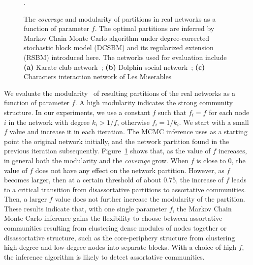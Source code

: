\begin{figure}[!htb]
    \caption{The \textit{coverage} and modularity  of partitions in real networks as a function of parameter $f$. The optimal partitions are inferred by Markov Chain Monte Carlo algorithm under degree-corrected stochastic block model (DCSBM) and its regularized extension (RSBM) introduced here. The networks used for evaluation include \textbf{(a)} Karate club network~\cite{zachary1977information}; \textbf{(b)} Dolphin social network~\cite{lusseau2003bottlenose}; \textbf{(c)} Characters interaction network of Les Miserables~\cite{newman2004finding}}.
    \label{fig:gsbm_real2}
\end{figure}

We evaluate the modularity~\cite{newman2006modularity} of resulting partitions of the real networks as a function of parameter $f$. 
A high modularity indicates the strong community structure. In our experiments, we use a constant $f$ such that $f_i=f$ for each
node $i$ in the network with degree $k_i>1/f$, otherwise $f_i=1/k_i$. We start with a small $f$ value and increase it in each iteration.
The MCMC inference uses as a starting point the original network initially, and the network partition found in the previous iteration subsequently. Figure~\ref{fig:gsbm_real2} shows that, as the value of $f$ increases, in general both the modularity and the \textit{coverage} grow. When $f$ is close to 0, the value of $f$ does not have any effect on the network partition. However, as $f$ becomes larger, then at a certain threshold of about 0.75, the increase of $f$ leads to a critical transition from disassortative partitions to assortative communities. Then, a larger $f$ value does not further increase the modularity  of the partition. These results indicate that, with one single parameter $f$, the Markov Chain Monte Carlo inference gains the flexibility to choose between assortative communities resulting from clustering dense modules of nodes together or disassortative structure, such as the core-periphery structure from clustering high-degree and low-degree nodes into separate blocks. With a choice of high $f$, the inference algorithm is likely to detect assortative communities.



